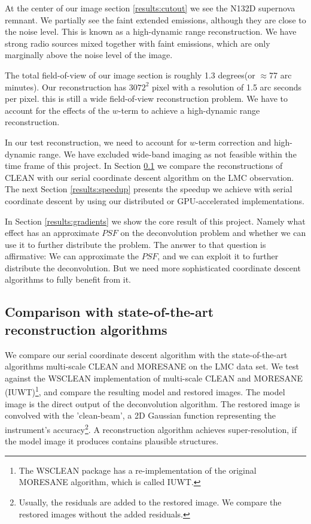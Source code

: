 At the center of our image section \ref{results:cutout} we see the N132D supernova remnant. We partially see the faint extended emissions, although they are close to the noise level. This is known as a high-dynamic range reconstruction. We have strong radio sources mixed together with faint emissions, which are only marginally above the noise level of the image.

The total field-of-view of our image section is roughly 1.3 degrees(or $\approx$77 arc minutes). Our reconstruction has $3072^2$ pixel with a resolution of 1.5 arc seconds per pixel. this is still a wide field-of-view reconstruction problem. We have to account for the effects of the $w$-term to achieve a high-dynamic range reconstruction.

In our test reconstruction, we need to account for $w$-term correction and high-dynamic range. We have excluded wide-band imaging as not feasible within the time frame of this project. In Section \ref{results:cleancomp} we compare the reconstructions of CLEAN with our serial coordinate descent algorithm on the LMC observation. The next Section \ref{results:speedup} presents the speedup we achieve with serial coordinate descent by using our distributed or GPU-accelerated implementations.

In Section \ref{results:gradients} we show the core result of this project. Namely what effect has an approximate $PSF$ on the deconvolution problem and whether we can use it to further distribute the problem. The answer to that question is affirmative: We can approximate the $PSF$, and we can exploit it to further distribute the deconvolution. But we need more sophisticated coordinate descent algorithms to fully benefit from it.


\subsection{Comparison with state-of-the-art reconstruction algorithms} \label{results:cleancomp}
We compare our serial coordinate descent algorithm with the state-of-the-art algorithms multi-scale CLEAN and MORESANE on the LMC data set. We test against the WSCLEAN \cite{offringa2014wsclean} implementation of multi-scale CLEAN and MORESANE (IUWT)\footnote{The WSCLEAN package has a re-implementation of the original MORESANE algorithm\cite{dabbech2015moresane}, which is called IUWT.}, and compare the resulting model and restored images. The model image is the direct output of the deconvolution algorithm. The restored image is convolved with the 'clean-beam', a 2D Gaussian function representing the instrument's accuracy\footnote{Usually, the residuals are added to the restored image. We compare the restored images without the added residuals.}. A reconstruction algorithm achieves super-resolution, if the model image it produces contains plausible structures.

